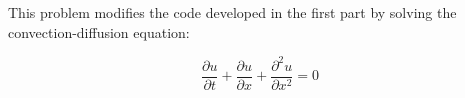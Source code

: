 \documentclass[10pt]{article}
\newcommand{\beq}{\begin{equation}}
\newcommand{\eeq}{\end{equation}}
\begin{document}
This problem modifies the code developed in the first part by solving the convection-diffusion equation:

\beq
\frac{\partial u}{\partial t}+\frac{\partial u}{\partial x}+\frac{\partial^2 u}{\partial x^2}=0
\eeq





\begin{comment}
\begin{figure}[H]
\centering
\texttt{[image: figures/difference1.png]}
\caption{Difference between the Godunov solution and the Roe solution at various time steps.}
\end{figure}
\end{comment}









\begin{comment}
\section{Appendix}
\subsection{Question 1}
\subsubsection{{\tt flux.m}}
This function calculates the flux given a density.

\end{comment}
\end{document}

